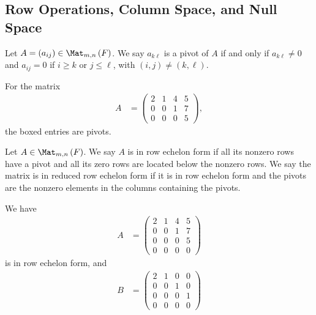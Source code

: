 \documentclass[10pt]{mypackage}
\begin{document}
\subsection{Row Operations, Column Space, and Null Space}%
\begin{definition}[Pivot]
  Let $A = \left(a_{ij}\right)\in \Mat_{m,n}\left(F\right)$. We say $a_{k\ell}$ is a pivot of $A$ if and only if $a_{k\ell}\neq 0$ and $a_{ij} = 0$ if $i\geq k$ or $j\leq \ell$, with $\left(i,j\right)\neq \left(k,\ell\right)$.
\end{definition}
\begin{example}
  For the matrix
  \begin{align*}
    A &= \begin{pmatrix}\boxed{2} & 1 & 4 & 5 \\ 0 & 0 & \boxed{1} & 7 \\ 0 & 0 & 0 & \boxed{5}\end{pmatrix},
  \end{align*}
  the boxed entries are pivots.
\end{example}
\begin{definition}
  Let $A\in \Mat_{m,n}\left(F\right)$. We say $A$ is in row echelon form if all its nonzero rows have a pivot and all its zero rows are located below the nonzero rows. We say the matrix is in reduced row echelon form if it is in row echelon form and the pivots are the nonzero elements in the columns containing the pivots.
\end{definition}
\begin{example}
  We have
  \begin{align*}
    A &= \begin{pmatrix}2 & 1 & 4 & 5 \\ 0 & 0 & 1 & 7 \\ 0 & 0 & 0 & 5 \\ 0 & 0 & 0 & 0\end{pmatrix}
  \end{align*}
  is in row echelon form, and
  \begin{align*}
    B &= \begin{pmatrix}2 & 1 & 0 & 0 \\ 0 & 0 & 1 & 0 \\ 0 & 0 & 0 & 1\\0 & 0 & 0 & 0\end{pmatrix}
  \end{align*}
\end{example}
\end{document}
